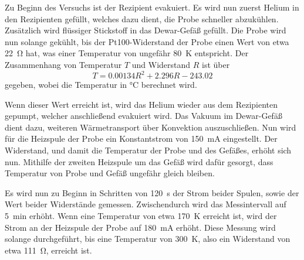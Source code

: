     Zu Beginn des Versuchs ist der Rezipient evakuiert.
    Es wird nun zuerst Helium in den Rezipienten gefüllt,
    welches dazu dient,
    die Probe schneller abzukühlen.
    Zusätzlich wird flüssiger Stickstoff in das Dewar-Gefäß gefüllt.
    Die Probe wird nun solange gekühlt,
    bis der Pt100-Widerstand der Probe einen Wert von etwa \SI{22}{\ohm} hat,
    was einer Temperatur von ungefähr \SI{80}{\kelvin} entspricht.
    Der Zusammenhang von Temperatur $T$ und Widerstand $R$ ist über
    \begin{equation}
        T = \num{0.00134} R^2 + \num{2.296} R - \num{243.02}
        \label{eqn:durchfuehrung:pt100}
    \end{equation}
    gegeben,
    wobei die Temperatur in \si{\celsius} berechnet wird.

    Wenn dieser Wert erreicht ist,
    wird das Helium wieder aus dem Rezipienten gepumpt,
    welcher anschließend evakuiert wird.
    Das Vakuum im Dewar-Gefäß dient dazu,
    weiteren Wärmetransport über Konvektion auszuschließen.
    Nun wird für die Heizspule der Probe ein Konstantstrom von \SI{150}{\milli\ampere} eingestellt.
    Der Widerstand,
    und damit die Temperatur der Probe und des Gefäßes,
    erhöht sich nun.
    Mithilfe der zweiten Heizspule um das Gefäß wird dafür gesorgt,
    dass Temperatur von Probe und Gefäß ungefähr gleich bleiben.

    Es wird nun zu Beginn in Schritten von \SI{120}{\second} der Strom beider Spulen,
    sowie der Wert beider Widerstände gemessen.
    Zwischendurch wird das Messintervall auf \SI{5}{\minute} erhöht.
    Wenn eine Temperatur von etwa \SI{170}{\kelvin} erreicht ist,
    wird der Strom an der Heizspule der Probe auf \SI{180}{\milli\ampere} erhöht.
    Diese Messung wird solange durchgeführt,
    bis eine Temperatur von \SI{300}{\kelvin},
    also ein Widerstand von etwa \SI{111}{\ohm},
    erreicht ist.

